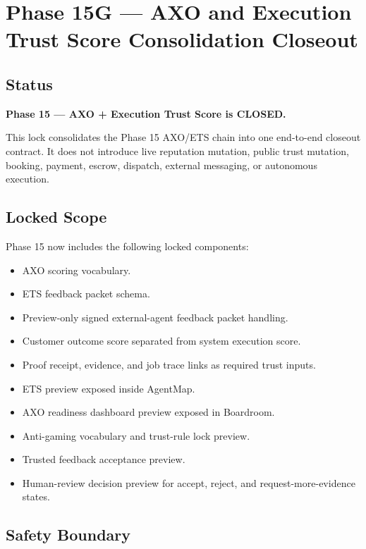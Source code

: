 \section{Phase 15G --- AXO and Execution Trust Score Consolidation Closeout}
\label{sec:phase15g-axo-ets-consolidation-closeout-lock}

\subsection{Status}

\textbf{Phase 15 --- AXO + Execution Trust Score is CLOSED.}

This lock consolidates the Phase 15 AXO/ETS chain into one end-to-end closeout contract. It does not introduce live reputation mutation, public trust mutation, booking, payment, escrow, dispatch, external messaging, or autonomous execution.

\subsection{Locked Scope}

Phase 15 now includes the following locked components:

\begin{itemize}
  \item AXO scoring vocabulary.
  \item ETS feedback packet schema.
  \item Preview-only signed external-agent feedback packet handling.
  \item Customer outcome score separated from system execution score.
  \item Proof receipt, evidence, and job trace links as required trust inputs.
  \item ETS preview exposed inside AgentMap.
  \item AXO readiness dashboard preview exposed in Boardroom.
  \item Anti-gaming vocabulary and trust-rule lock preview.
  \item Trusted feedback acceptance preview.
  \item Human-review decision preview for accept, reject, and request-more-evidence states.
\end{itemize}

\subsection{Safety Boundary}

